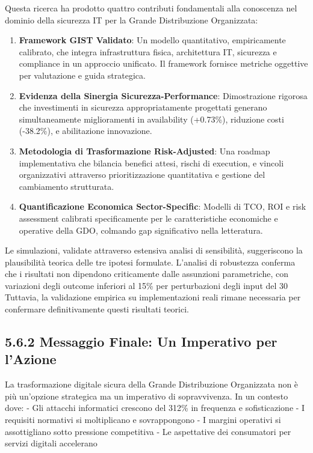 \documentclass[12pt,a4paper,oneside]{book}
\numberwithin{figure}{chapter} %
\numberwithin{table}{chapter}  %
\begin{document}
Questa ricerca ha prodotto quattro contributi fondamentali alla
conoscenza nel dominio della sicurezza IT per la Grande Distribuzione
Organizzata:

\begin{enumerate}
\def\labelenumi{\arabic{enumi}.}
\item
  \textbf{Framework GIST Validato}: Un modello quantitativo,
  empiricamente calibrato, che integra infrastruttura fisica,
  architettura IT, sicurezza e compliance in un approccio unificato. Il
  framework fornisce metriche oggettive per valutazione e guida
  strategica.
\item
  \textbf{Evidenza della Sinergia Sicurezza-Performance}: Dimostrazione
  rigorosa che investimenti in sicurezza appropriatamente progettati
  generano simultaneamente miglioramenti in availability (+0.73\%),
  riduzione costi (-38.2\%), e abilitazione innovazione.
\item
  \textbf{Metodologia di Trasformazione Risk-Adjusted}: Una roadmap
  implementativa che bilancia benefici attesi, rischi di execution, e
  vincoli organizzativi attraverso prioritizzazione quantitativa e
  gestione del cambiamento strutturata.
\item
  \textbf{Quantificazione Economica Sector-Specific}: Modelli di TCO,
  ROI e risk assessment calibrati specificamente per le caratteristiche
  economiche e operative della GDO, colmando gap significativo nella
  letteratura.
\end{enumerate}

Le simulazioni, validate attraverso estensiva analisi di sensibilità,
suggeriscono la plausibilità teorica delle tre ipotesi formulate.
L'analisi di robustezza conferma che i risultati non dipendono
criticamente dalle assunzioni parametriche, con variazioni degli
outcome inferiori al 15\% per perturbazioni degli input del 30%
Tuttavia, la validazione empirica su implementazioni reali rimane
necessaria per confermare definitivamente questi risultati teorici.

\subsection{5.6.2 Messaggio Finale: Un Imperativo per
l'Azione}\label{messaggio-finale-un-imperativo-per-lazione}

La trasformazione digitale sicura della Grande Distribuzione Organizzata
non è più un'opzione strategica ma un imperativo di sopravvivenza. In un
contesto dove: - Gli attacchi informatici crescono del 312\% in
frequenza e sofisticazione - I requisiti normativi si moltiplicano e
sovrappongono - I margini operativi si assottigliano sotto pressione
competitiva - Le aspettative dei consumatori per servizi digitali
accelerano
\end{document}
